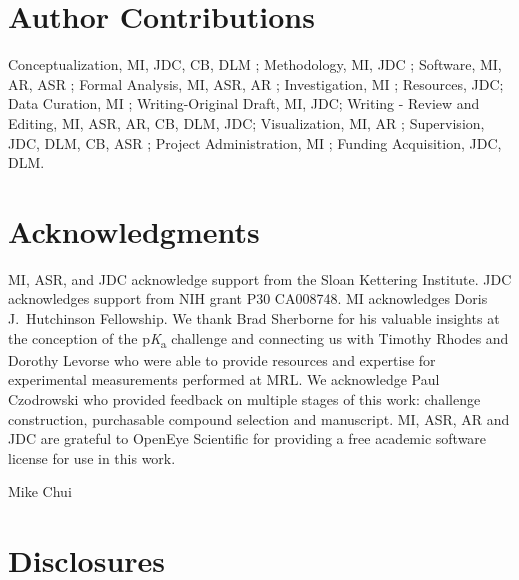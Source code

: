\documentclass[9pt,lineno,final]{elife}
\newcommand{\pKa}{p\textit{K}\textsubscript{a}}
\begin{document}
\section{Author Contributions}

Conceptualization, MI, JDC, CB, DLM ; Methodology, MI, JDC ; Software, MI, AR, ASR ; Formal Analysis, MI, ASR, AR ; Investigation, MI ; Resources, JDC;  Data Curation, MI ; Writing-Original Draft, MI, JDC; Writing - Review and Editing, MI, ASR, AR, CB, DLM, JDC; Visualization, MI, AR ; Supervision, JDC, DLM, CB, ASR ; Project Administration, MI ; Funding Acquisition, JDC, DLM.


\section{Acknowledgments}

MI, ASR, and JDC acknowledge support from the Sloan Kettering Institute.
JDC acknowledges support from NIH grant P30 CA008748. 
MI acknowledges Doris J.\ Hutchinson Fellowship. 
We thank Brad Sherborne for his valuable insights at the conception of the \pKa{} challenge and connecting us with Timothy Rhodes and Dorothy Levorse who were able to provide resources and expertise for experimental measurements performed at MRL. 
We acknowledge Paul Czodrowski who provided feedback on multiple stages of this work: challenge construction, purchasable compound selection and manuscript. 
MI, ASR, AR and JDC are grateful to OpenEye Scientific for providing a free academic software license for use in this work.

Mike Chui

\section{Disclosures}
\end{document}

